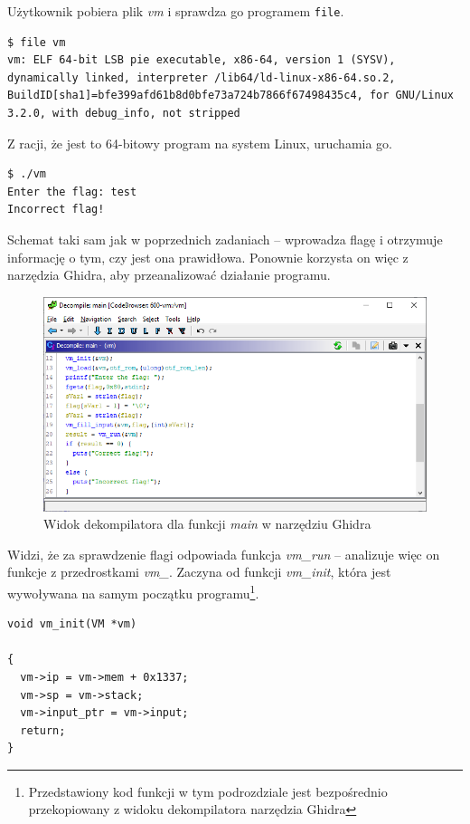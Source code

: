 \documentclass[language=polish,type=eng]{aghmodern}
\begin{document}
Użytkownik pobiera plik \emph{vm} i sprawdza go programem \texttt{file}.

\begin{verbatim}
$ file vm
vm: ELF 64-bit LSB pie executable, x86-64, version 1 (SYSV), dynamically linked, interpreter /lib64/ld-linux-x86-64.so.2, BuildID[sha1]=bfe399afd61b8d0bfe73a724b7866f67498435c4, for GNU/Linux 3.2.0, with debug_info, not stripped
\end{verbatim}

Z racji, że jest to 64-bitowy program na system Linux, uruchamia go.

\begin{verbatim}
$ ./vm
Enter the flag: test
Incorrect flag!
\end{verbatim}

Schemat taki sam jak w poprzednich zadaniach -- wprowadza flagę i otrzymuje informację
o tym, czy jest ona prawidłowa. Ponownie korzysta on więc z narzędzia Ghidra, aby
przeanalizować działanie programu.

\begin{figure}[H]
\centering
\includegraphics[width=\textwidth]{600_main}
\caption{Widok dekompilatora dla funkcji \emph{main} w narzędziu Ghidra}
\end{figure}

Widzi, że za sprawdzenie flagi odpowiada funkcja \emph{vm\_run} -- analizuje więc on
funkcje z przedrostkami \emph{vm\_}. Zaczyna od funkcji \emph{vm\_init}, która jest
wywoływana na samym początku programu\footnote{Przedstawiony kod funkcji w tym podrozdziale
jest bezpośrednio przekopiowany z widoku dekompilatora narzędzia Ghidra}.

\begin{verbatim}
void vm_init(VM *vm)

{
  vm->ip = vm->mem + 0x1337;
  vm->sp = vm->stack;
  vm->input_ptr = vm->input;
  return;
}
\end{verbatim}
\end{document}
